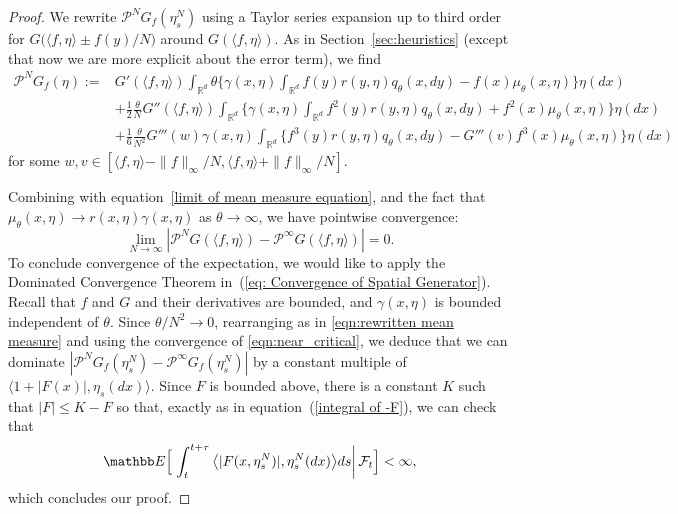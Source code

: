 \documentclass[EJP]{ejpecp} %
\newcommand{\IE}{\mathbb E}
\newcommand{\IR}{\mathbb R}
\newcommand{\Pgen}{\mathcal{P}}    %
\begin{document}
\begin{proof}
We rewrite $\Pgen^NG_f(\eta^N_s)$ using a 
Taylor series expansion up to third order for
$G\big(\langle f,\eta\rangle\pm f(y)/N\big)$ around
$G(\langle f, \eta \rangle )$.
As in Section~\ref{sec:heuristics} (except that now we are more explicit about
the error term), we find
\begin{equation} 
    \label{eq: Pre-Limit Generator Expanded}
\begin{aligned}
\Pgen^{N} G_f(\eta)
    :=& 
    G'(\langle f, \eta \rangle)\int_{\IR^d}  
    \theta\Big\{ \gamma(x,\eta) \int_{\IR^d} f(y)r(y,\eta) q_{\theta}(x,dy) 
    - f(x)\mu_\theta(x,\eta) \Big\} \eta(dx)\\
&+\frac{1}{2}\frac{\theta}{N}G''(\langle f, \eta \rangle)\int_{\IR^d} 
    \Big\{\gamma(x, \eta)\int_{\IR^d} f^2(y) r(y,\eta)q_{\theta}(x,dy)+f^2(x)
    \mu_\theta(x, \eta) \Big\} \eta(dx) \\
&+\frac{1}{6}\frac{\theta}{N^2}
    G'''(w) \gamma(x, \eta)\int_{\IR^d} \Big\{ f^3(y) r(y,\eta) 
    q_{\theta}(x,dy)
    - G'''(v)f^3(x)\mu_\theta(x, \eta) \Big\} \eta(dx)
\end{aligned}    
\end{equation}
for some $w,v \in [\langle f,\eta \rangle - \|f\|_\infty/N, 
\langle f,\eta \rangle + \|f\|_\infty/N]$.

Combining with equation~\eqref{limit of mean measure equation}, and the fact
that $\mu_\theta(x,\eta) \to r(x,\eta)\gamma(x,\eta)$ as $\theta\to\infty$, we have
pointwise convergence:
\begin{equation}
\lim_{N\to \infty} |\mathcal{P}^{N}G(\langle f, \eta \rangle) 
- \mathcal{P}^{\infty}G(\langle f, \eta \rangle)| = 0 .
\end{equation}
To conclude convergence of the expectation, 
we would like to apply the Dominated Convergence 
Theorem in~(\ref{eq: Convergence of Spatial Generator}).
Recall that $f$ and $G$ and their derivatives are bounded,
and $\gamma(x,\eta)$ is bounded independent of $\theta$.
Since $\theta/N^2 \to 0$,
rearranging as in \eqref{eqn:rewritten mean measure}
and using the convergence of \eqref{eqn:near_critical},
we deduce that we can dominate
$\left| \Pgen^{N}G_f(\eta^{N}_s) -\Pgen^{\infty}G_f(\eta^{N}_s) \right|$
by a constant multiple of $\langle 1+|F(x)|,\eta_s(dx)\rangle$.
Since $F$ is bounded above, there is a constant $K$ such that $|F|\leq K-F$ so
that, exactly as in equation~(\ref{integral of -F}), 
we can check that
\[
\IE\Big[\left.\int_t^{t+\tau}\big\langle |F(x,\eta^N_s)|,\eta^N_s(dx)\big\rangle ds
\right| {\cal F}_t\Big]<\infty,
\]
which concludes our proof.
\end{proof}
\end{document}
